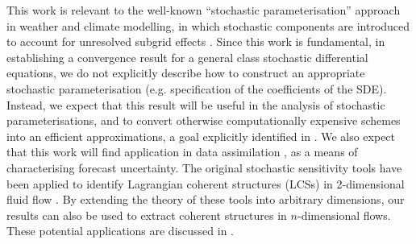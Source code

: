 
This work is relevant to the well-known ``stochastic parameterisation'' approach in weather and climate modelling, in which stochastic components are introduced to account for unresolved subgrid effects \cite{BernerEtAl_2017_StochasticParameterizationNew,LeutbecherEtAl_2017_StochasticRepresentationsModel,Palmer_2019_StochasticWeatherClimate}.
Since this work is fundamental, in establishing a convergence result for a general class stochastic differential equations, we do not explicitly describe how to construct an appropriate stochastic parameterisation (e.g. specification of the coefficients of the SDE).
Instead, we expect that this result will be useful in the analysis of stochastic parameterisations, and to convert otherwise computationally expensive schemes into an efficient approximations, a goal explicitly identified in \cite{LeutbecherEtAl_2017_StochasticRepresentationsModel}.
We also expect that this work will find application in data assimilation \cite{BudhirajaEtAl_2019_AssimilatingDataModels,Jazwinski_2014_StochasticProcessesFiltering,LawEtAl_2015_DataAssimilationMathematical,ReichCotter_2015_ProbabilisticForecastingBayesian}, as a means of characterising forecast uncertainty.
The original stochastic sensitivity tools have been applied to identify Lagrangian coherent structures (LCSs) in 2-dimensional fluid flow \cite{BadzaEtAl_2023_HowSensitiveAre, Balasuriya_2020_StochasticSensitivityComputable}.
By extending the theory of these tools into arbitrary dimensions, our results can also be used to extract coherent structures in \(n\)-dimensional flows.
These potential applications are discussed in .

